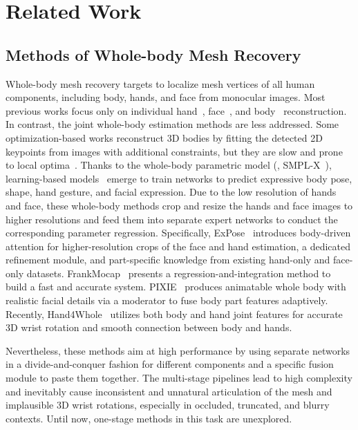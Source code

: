 \documentclass[10pt,twocolumn,letterpaper]{article}
\begin{document}
\section{Related Work}
\label{sec:related}
\subsection{Methods of Whole-body Mesh Recovery}
\label{sec:related_method}
Whole-body mesh recovery targets to localize mesh vertices of all human components, including body, hands, and face from monocular images. Most previous works focus only on individual hand~\cite{AdnaneBoukhayma20193DHS,LinHuang2021SurveyOD,TheocharisChatzis2020ACS}, face~\cite{OswaldAldrian2013InverseRO,AyushTewari2017MoFAMD,YuDeng2019Accurate3F,BernhardEgger20203DMF}, and body~\cite{Kolotouros_2019_spin,zeng2022deciwatch,tian2022survey, kocabas2021pare, kocabas2021spec} reconstruction.
In contrast, the joint whole-body estimation methods are less addressed. Some optimization-based works reconstruct 3D bodies by fitting the detected 2D keypoints from images with additional constraints, but they are slow and prone to local optima~\cite{Pavlakos_2019smplx,Xiang_2019_wholebody3d}.
Thanks to the whole-body parametric model (\eg, SMPL-X~\cite{Pavlakos_2019smplx}), learning-based models~\cite{PavlakosGeorgios2020expose,Rong_2021frank,Zhou_2021_full,Feng_2021_pixie, sun2022learning} emerge to train networks to predict expressive body pose, shape, hand gesture, and facial expression. 
Due to the low resolution of hands and face, these whole-body methods crop and resize the hands and face images to higher resolutions and feed them into separate expert networks to conduct the corresponding parameter regression. 
Specifically, ExPose~\cite{PavlakosGeorgios2020expose} introduces body-driven attention for higher-resolution crops of the face and hand estimation, a dedicated refinement module, and part-specific knowledge from existing hand-only and face-only datasets.
FrankMocap~\cite{Rong_2021frank} presents a regression-and-integration method to build a fast and accurate system.
PIXIE~\cite{Feng_2021_pixie} produces animatable whole body with realistic facial details via a moderator to fuse body part features adaptively.
Recently, Hand4Whole~\cite{GyeongsikMoon2020hand4whole} utilizes both body and hand joint features for accurate 3D wrist rotation and smooth connection between body and hands.

Nevertheless, these methods aim at high performance by using separate networks in a divide-and-conquer fashion for different components and a specific fusion module to paste them together.
The multi-stage pipelines lead to high complexity and inevitably cause inconsistent and unnatural articulation of the mesh and implausible 3D wrist rotations, especially in occluded, truncated, and blurry contexts. Until now, one-stage methods in this task are unexplored.
\end{document}
